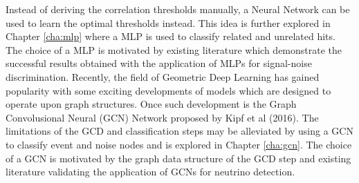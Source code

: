 Instead of deriving the correlation thresholds manually, a Neural
Network can be used to learn the optimal thresholds instead. This idea
is further explored in Chapter \ref{cha:mlp} where a MLP is used to
classify related and unrelated hits. The choice of a MLP is motivated
by existing literature which demonstrate the successful results
obtained with the application of MLPs for signal-noise discrimination.
Recently, the field of Geometric Deep Learning has gained popularity
with some exciting developments of models which are designed to
operate upon graph structures. Once such development is the Graph
Convolusional Neural (GCN) Network proposed by Kipf et al (2016). The
limitations of the GCD and classification steps may be alleviated by
using a GCN to classify event and noise nodes and is explored in
Chapter \ref{cha:gcn}. The choice of a GCN is motivated by the graph
data structure of the GCD step and existing literature validating the
application of GCNs for neutrino detection.
